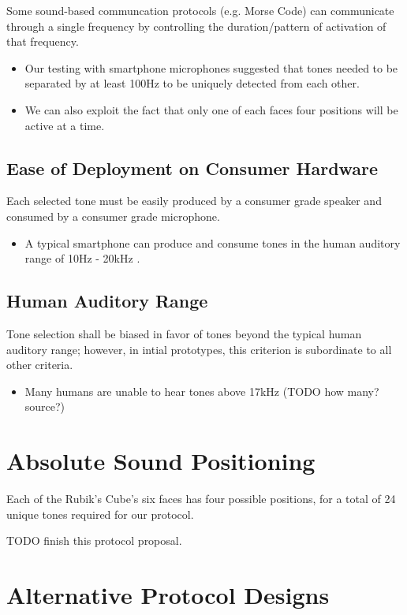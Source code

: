 Some sound-based communcation protocols (e.g. Morse Code) can communicate through a single frequency by controlling the duration/pattern of activation of that frequency. \cite{TODO}
\begin{itemize}
    \item Our testing with smartphone microphones suggested that tones needed to be separated by at least 100Hz to be uniquely detected from each other.
    \item We can also exploit the fact that only one of each faces four positions will be active at a time.
\end{itemize}

\subsection{Ease of Deployment on Consumer Hardware}
Each selected tone must be easily produced by a consumer grade speaker and consumed by a consumer grade microphone.
\begin{itemize}
    \item A typical smartphone can produce and consume tones in the human auditory range of 10Hz - 20kHz \cite{TODO}.
\end{itemize}

\subsection{Human Auditory Range}
Tone selection shall be biased in favor of tones beyond the typical human auditory range; however, in intial prototypes, this criterion is subordinate to all other criteria.
\begin{itemize}
    \item Many humans are unable to hear tones above 17kHz (TODO how many? source?)
\end{itemize}


\section{Absolute Sound Positioning}

Each of the Rubik's Cube's six faces has four possible positions, for a total of 24 unique tones required for our protocol.

TODO finish this protocol proposal.


\section{Alternative Protocol Designs}

